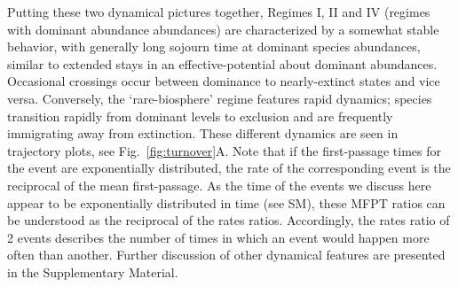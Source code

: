 \documentclass[9pt,twocolumn,twoside,lineno]{pnas-new}
\begin{document}
Putting these two dynamical pictures together, 
Regimes I, II and IV (regimes with dominant abundance abundances) are characterized by a somewhat stable behavior, with generally long sojourn time at dominant species abundances, similar to extended stays in an effective-potential about dominant abundances.
Occasional crossings occur between dominance to nearly-extinct states and vice versa. 
Conversely, the `rare-biosphere' regime features rapid dynamics; species transition rapidly from dominant levels to exclusion and are frequently immigrating away from extinction. 
These different dynamics are seen in trajectory plots, see Fig.~\ref{fig:turnover}A. 
Note that if the first-passage times for the event are exponentially distributed, the rate of the corresponding event is the reciprocal of the mean first-passage.
As the time of the events we discuss here appear to be exponentially distributed in time (see SM), these MFPT ratios can be understood as the reciprocal of the rates ratios.
Accordingly, the rates ratio of 2 events describes the number of times in which an event would happen more often than another.
Further discussion of other dynamical features are presented in the Supplementary Material. 

 


\end{document}
